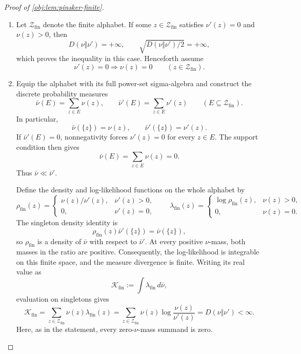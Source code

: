 \documentclass[11pt]{article}
\begin{document}
\begin{proof}[Proof of \cref{obj:lem:pinsker-finite}]
\begin{enumerate}
\item Let \(\mathcal Z_{\mathrm{fin}}\) denote the finite alphabet. If some \(z\in\mathcal Z_{\mathrm{fin}}\) satisfies \(\nu'(z)=0\) and \(\nu(z)>0\), then
\[
D(\nu\Vert\nu')=+\infty,
\qquad
\sqrt{D(\nu\Vert\nu')/2}=+\infty,
\]
which proves the inequality in this case. Henceforth assume
\[
\nu'(z)=0\Longrightarrow \nu(z)=0
\qquad(z\in\mathcal Z_{\mathrm{fin}}).
\]

\item Equip the alphabet with its full power-set sigma-algebra and construct the discrete probability measures
\[
\bar\nu(E)=\sum_{z\in E}\nu(z),
\qquad
\bar\nu'(E)=\sum_{z\in E}\nu'(z)
\qquad(E\subseteq\mathcal Z_{\mathrm{fin}}).
\]
In particular,
\[
\bar\nu(\{z\})=\nu(z),
\qquad
\bar\nu'(\{z\})=\nu'(z).
\]
If \(\bar\nu'(E)=0\), nonnegativity forces \(\nu'(z)=0\) for every \(z\in E\). The support condition then gives
\[
\bar\nu(E)=\sum_{z\in E}\nu(z)=0.
\]
Thus \(\bar\nu\ll\bar\nu'\).

Define the density and log-likelihood functions on the whole alphabet by
\[
\rho_{\mathrm{fin}}(z)=
\begin{cases}
\nu(z)/\nu'(z),&\nu'(z)>0,\\
0,&\nu'(z)=0,
\end{cases}
\qquad
\lambda_{\mathrm{fin}}(z)=
\begin{cases}
\log\rho_{\mathrm{fin}}(z),&\nu(z)>0,\\
0,&\nu(z)=0.
\end{cases}
\]
The singleton density identity is
\[
\rho_{\mathrm{fin}}(z)\bar\nu'(\{z\})
=\bar\nu(\{z\}),
\]
so \(\rho_{\mathrm{fin}}\) is a density of \(\bar\nu\) with respect to \(\bar\nu'\). At every positive \(\nu\)-mass, both masses in the ratio are positive. Consequently, the log-likelihood is integrable on this finite space, and the measure divergence is finite. Writing its real value as
\[
\mathcal K_{\mathrm{fin}}
:=\int\lambda_{\mathrm{fin}}\,d\bar\nu,
\]
evaluation on singletons gives
\[
\mathcal K_{\mathrm{fin}}
=\sum_{z\in\mathcal Z_{\mathrm{fin}}}
  \nu(z)\lambda_{\mathrm{fin}}(z)
=\sum_{z\in\mathcal Z_{\mathrm{fin}}}
  \nu(z)\log\frac{\nu(z)}{\nu'(z)}
=D(\nu\Vert\nu')<\infty.
\]
Here, as in the statement, every zero-\(\nu\)-mass summand is zero.


\end{enumerate}
\end{proof}
\end{document}
